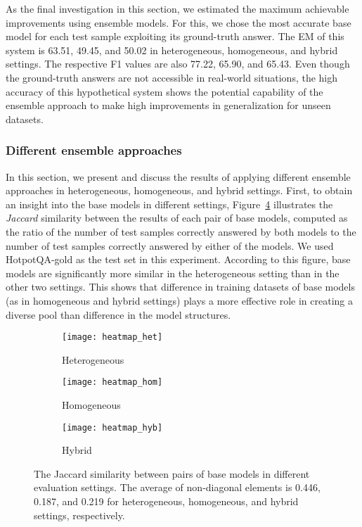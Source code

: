 \documentclass[review]{elsarticle}
\begin{document}
As the final investigation in this section, we estimated the maximum achievable improvements using ensemble models. For this, we chose the most accurate base model for each test sample exploiting its ground-truth answer. The EM of this system is 63.51, 49.45, and 50.02 in heterogeneous, homogeneous, and hybrid settings. The respective F1 values are also 77.22, 65.90, and 65.43.
Even though the ground-truth answers are not accessible in real-world situations, the high accuracy of this hypothetical system shows the potential capability of the ensemble approach to make high improvements in generalization for unseen datasets.

\subsubsection{Different ensemble approaches}
\label{subsec:dif-ensemble}
In this section, we present and discuss the results of applying different ensemble approaches in heterogeneous, homogeneous, and hybrid settings. First, to obtain an insight into the base models in different settings, Figure~\ref{fig:jaccard} illustrates the \textit{Jaccard} similarity between the results of each pair of base models, computed as the ratio of the number of test samples correctly answered by both models to the number of test samples correctly answered by either of the models. We used HotpotQA-gold as the test set in this experiment. According to this figure, base models are significantly more similar in the heterogeneous setting than in the other two settings. This shows that difference in training datasets of base models (as in homogeneous and hybrid settings) plays a more effective role in creating a diverse pool than difference in the model structures.

\begin{figure}
\centering
\begin{subfigure}[t]{.32\linewidth}
\texttt{[image: heatmap\_het]} 
\hfill
\caption{Heterogeneous}
\label{fig:jaccard-heterogeneous}
\end{subfigure}
\begin{subfigure}[t]{.32\linewidth}
\texttt{[image: heatmap\_hom]} 
\caption{Homogeneous}
\label{fig:jaccard-homogeneous}
\end{subfigure}
\begin{subfigure}[t]{.32\linewidth}
\texttt{[image: heatmap\_hyb]} 
\caption{Hybrid}
\label{fig:jaccard-hybrid}
\end{subfigure}
\caption{The Jaccard similarity between pairs of base models in different evaluation settings. The average of non-diagonal elements is 0.446, 0.187, and 0.219 for heterogeneous, homogeneous, and hybrid settings, respectively.}
\label{fig:jaccard}
\end{figure}
\end{document}
